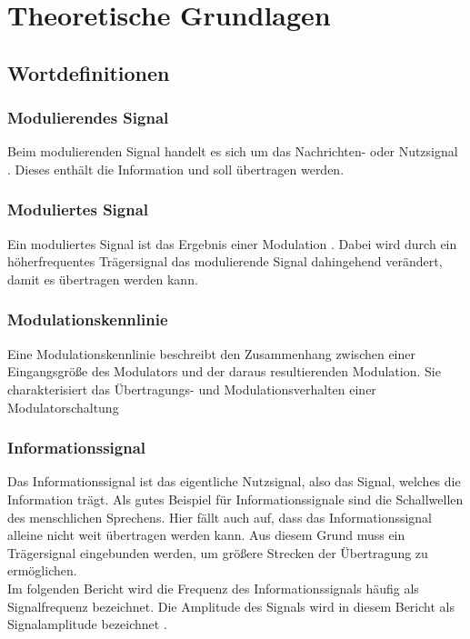 \documentclass[12pt]{scrartcl}
\begin{document}
\tableofcontents 
\newpage 
\listoffigures 
\listoftables 
\newpage %
\section{Theoretische Grundlagen}
\subsection{Wortdefinitionen}
\subsubsection*{Modulierendes Signal}
Beim modulierenden Signal handelt es sich um das Nachrichten- oder Nutzsignal \cite{GoldenbaumGitskript}. 
Dieses enthält die Information und soll übertragen werden.

\subsubsection*{Moduliertes Signal}
Ein moduliertes Signal ist das Ergebnis einer Modulation \cite{GoldenbaumGitskript}.
Dabei wird durch ein höherfrequentes Trägersignal das modulierende Signal dahingehend verändert, damit es übertragen werden kann.

\subsubsection*{Modulationskennlinie}
Eine Modulationskennlinie beschreibt den Zusammenhang zwischen einer Eingangsgröße des Modulators und der daraus resultierenden Modulation. 
Sie charakterisiert das Übertragungs- und Modulationsverhalten einer Modulatorschaltung

\subsubsection*{Informationssignal}
Das Informationssignal ist das eigentliche Nutzsignal, also das Signal, welches die Information trägt.
Als gutes Beispiel für Informationssignale sind die Schallwellen des menschlichen Sprechens. 
Hier fällt auch auf, dass das Informationssignal alleine nicht weit übertragen werden kann.
Aus diesem Grund muss ein Trägersignal eingebunden werden, um größere Strecken der Übertragung zu ermöglichen.\\
Im folgenden Bericht wird die Frequenz des Informationssignals häufig als Signalfrequenz bezeichnet. 
Die Amplitude des Signals wird in diesem Bericht als Signalamplitude bezeichnet \cite{GoldenbaumGitskript}.
\end{document}

